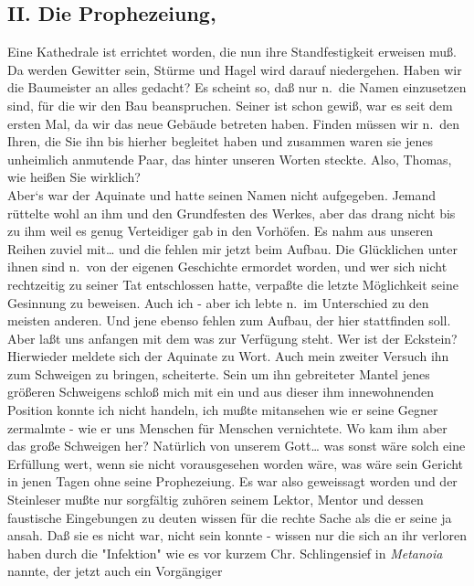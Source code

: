 \documentclass[
]{article}
\author{}
\date{\vspace{-2.5em}}
\begin{document}
\subsection{II. Die Prophezeiung,}\label{ii.-die-prophezeiung}

Eine Kathedrale ist errichtet worden, die nun ihre Standfestigkeit
erweisen muß. Da werden Gewitter sein, Stürme und Hagel wird darauf
niedergehen. Haben wir die Baumeister an alles gedacht? Es scheint so,
daß nur n.~die Namen einzusetzen sind, für die wir den Bau beanspruchen.
Seiner ist schon gewiß, war es seit dem ersten Mal, da wir das neue
Gebäude betreten haben. Finden müssen wir n.~den Ihren, die Sie ihn bis
hierher begleitet haben und zusammen waren sie jenes unheimlich
anmutende Paar, das hinter unseren Worten steckte. Also, Thomas, wie
heißen Sie wirklich?\\
Aber`s war der Aquinate und hatte seinen Namen nicht aufgegeben. Jemand
rüttelte wohl an ihm und den Grundfesten des Werkes, aber das drang
nicht bis zu ihm weil es genug Verteidiger gab in den Vorhöfen. Es nahm
aus unseren Reihen zuviel mit\ldots{} und die fehlen mir jetzt beim
Aufbau. Die Glücklichen unter ihnen sind n.~von der eigenen Geschichte
ermordet worden, und wer sich nicht rechtzeitig zu seiner Tat
entschlossen hatte, verpaßte die letzte Möglichkeit seine Gesinnung zu
beweisen. Auch ich - aber ich lebte n.~im Unterschied zu den meisten
anderen. Und jene ebenso fehlen zum Aufbau, der hier stattfinden soll.
Aber laßt uns anfangen mit dem was zur Verfügung steht. Wer ist der
Eckstein?\\
Hierwieder meldete sich der Aquinate zu Wort. Auch mein zweiter Versuch
ihn zum Schweigen zu bringen, scheiterte. Sein um ihn gebreiteter Mantel
jenes größeren Schweigens schloß mich mit ein und aus dieser ihm
innewohnenden Position konnte ich nicht handeln, ich mußte mitansehen
wie er seine Gegner zermalmte - wie er uns Menschen für Menschen
vernichtete. Wo kam ihm aber das große Schweigen her? Natürlich von
unserem Gott\ldots{} was sonst wäre solch eine Erfüllung wert, wenn sie
nicht vorausgesehen worden wäre, was wäre sein Gericht in jenen Tagen
ohne seine Prophezeiung. Es war also geweissagt worden und der
Steinleser mußte nur sorgfältig zuhören seinem Lektor, Mentor und dessen
faustische Eingebungen zu deuten wissen für die rechte Sache als die er
seine ja ansah. Daß sie es nicht war, nicht sein konnte - wissen nur die
sich an ihr verloren haben durch die "Infektion" wie es vor kurzem Chr.
Schlingensief in \emph{Metanoia }nannte, der jetzt auch ein Vorgängiger
\end{document}
